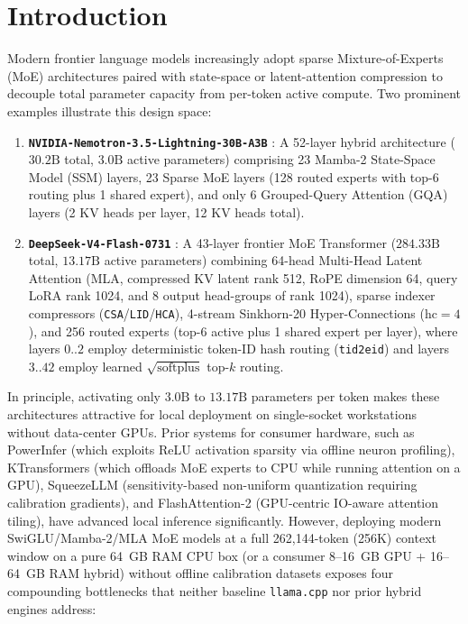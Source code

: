 \documentclass[10pt,twocolumn]{article}
\begin{document}
\section{Introduction}

Modern frontier language models increasingly adopt sparse Mixture-of-Experts (MoE) architectures paired with state-space or latent-attention compression to decouple total parameter capacity from per-token active compute. Two prominent examples illustrate this design space:
\begin{enumerate}
    \item \textbf{\texttt{NVIDIA-Nemotron-3.5-Lightning-30B-A3B}} \cite{nemotron2025}: A 52-layer hybrid architecture ($30.2\text{B}$ total, $3.0\text{B}$ active parameters) comprising 23 Mamba-2 State-Space Model (SSM) layers, 23 Sparse MoE layers (128 routed experts with top-6 routing plus 1 shared expert), and only 6 Grouped-Query Attention (GQA) layers (2 KV heads per layer, 12 KV heads total).
    \item \textbf{\texttt{DeepSeek-V4-Flash-0731}} \cite{deepseekv3}: A 43-layer frontier MoE Transformer ($284.33\text{B}$ total, $13.17\text{B}$ active parameters) combining 64-head Multi-Head Latent Attention (MLA, compressed KV latent rank 512, RoPE dimension 64, query LoRA rank 1024, and 8 output head-groups of rank 1024), sparse indexer compressors (\texttt{CSA}/\texttt{LID}/\texttt{HCA}), 4-stream Sinkhorn-20 Hyper-Connections ($\text{hc}=4$), and 256 routed experts (top-6 active plus 1 shared expert per layer), where layers $0..2$ employ deterministic token-ID hash routing (\texttt{tid2eid}) and layers $3..42$ employ learned $\sqrt{\text{softplus}}$ top-$k$ routing.
\end{enumerate}

In principle, activating only $3.0\text{B}$ to $13.17\text{B}$ parameters per token makes these architectures attractive for local deployment on single-socket workstations without data-center GPUs. Prior systems for consumer hardware, such as PowerInfer \cite{powerinfer} (which exploits ReLU activation sparsity via offline neuron profiling), KTransformers \cite{ktransformers} (which offloads MoE experts to CPU while running attention on a GPU), SqueezeLLM \cite{squeezellm} (sensitivity-based non-uniform quantization requiring calibration gradients), and FlashAttention-2 \cite{dao2023flashattention2} (GPU-centric IO-aware attention tiling), have advanced local inference significantly. However, deploying modern SwiGLU/Mamba-2/MLA MoE models at a full 262,144-token (256K) context window on a pure 64~GB RAM CPU box (or a consumer 8--16~GB GPU + 16--64~GB RAM hybrid) without offline calibration datasets exposes four compounding bottlenecks that neither baseline \texttt{llama.cpp} \cite{llamacpp} nor prior hybrid engines address:
\end{document}
